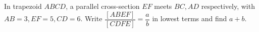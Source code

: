 In trapezoid $ABCD$, a parallel cross-section $EF$ meets $BC,AD$ respectively, with $AB=3,EF=5,CD=6$. Write $\dfrac{[ABEF]}{[CDFE]}=\dfrac{a}{b}$ in lowest terms and find $a+b$.
